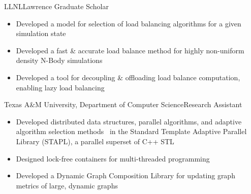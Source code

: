 		{LLNL}{Lawrence Graduate Scholar}{}{}
		{\begin{itemize}
            \item Developed a model for selection of load
                  balancing algorithms for a given simulation state~\cite{pearce:ics12}
            \item Developed a fast \& accurate load balance method for highly non-uniform density N-Body simulations~\cite{pearce:ics14}
            \item Developed a tool for decoupling \& offloading load balance computation,
                  enabling lazy load balancing~\cite{pearce:ipdps16}
		\end{itemize}}

		{Texas A\&M University, Department of Computer Science}{Research Assistant}{}{}
		{\begin{itemize}
			\item Developed distributed data structures, parallel algorithms,
				and adaptive algorithm selection methods~\cite{thomas:ppopp05}
				in the Standard Template Adaptive Parallel Library (STAPL),
			  	a parallel superset of C++ STL~\cite{tanase:ppopp11,buss:systor10,tanase:lcpc09}
			\item Designed lock-free containers for multi-threaded programming
			\item Developed a Dynamic Graph Composition Library for updating graph metrics of large, dynamic graphs
		\end{itemize}}

